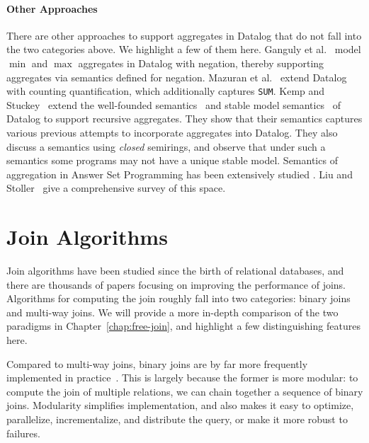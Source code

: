  \paragraph*{\bf Other Approaches}
 There are other approaches to support aggregates in Datalog that do not fall into
  the two categories above. We highlight a few of them here.
  Ganguly et al.~\cite{DBLP:conf/pods/GangulyGZ91}
  model $\min$ and $\max$ aggregates in Datalog with negation,
  thereby supporting aggregates via semantics defined for negation.
  Mazuran et al.~\cite{DBLP:journals/tplp/MazuranSZ13}
  extend Datalog with counting quantification,
  which additionally captures \texttt{SUM}.
 Kemp and Stuckey~\cite{DBLP:conf/slp/KempS91} extend the well-founded semantics~\cite{DBLP:journals/jacm/GelderRS91, DBLP:conf/pods/Gelder89}
  and stable model semantics~\cite{DBLP:conf/iclp/GelfondL88} of Datalog
  to support recursive aggregates.
 They show that their semantics captures various previous attempts to incorporate aggregates into Datalog.
 They also discuss a semantics using {\em closed} semirings, and observe that under such a semantics
  some programs may not have a unique stable model.
 Semantics of aggregation in Answer Set Programming has been extensively studied
  \cite{DBLP:journals/ai/FaberPL11, DBLP:journals/tplp/GelfondZ14, DBLP:journals/fuin/Alviano16}.
 Liu and Stoller~\cite{DBLP:conf/lfcs/LiuS22} give a comprehensive survey of this space.

\section{Join Algorithms}
\label{sec:related:joins}

Join algorithms have been studied since the birth of relational databases, 
 and there are thousands of papers focusing on improving the performance of joins.
Algorithms for computing the join roughly fall into two categories: 
 binary joins and multi-way joins.
We will provide a more in-depth comparison of the two paradigms in Chapter~\ref{chap:free-join}, 
 and highlight a few distinguishing features here.

Compared to multi-way joins, binary joins are by far more frequently implemented 
 in practice~\cite{gaffney2022sqlite, stonebraker1991postgres, raasveldt2019duckdb}.
This is largely because the former is more modular: 
 to compute the join of multiple relations, 
 we can chain together a sequence of binary joins.
Modularity simplifies implementation, 
 and also makes it easy to optimize, parallelize, incrementalize, and distribute 
 the query, or make it more robust to failures.

